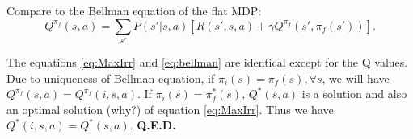 \documentclass{article} %
\newtheorem{definition}{Definition}
\newtheorem{theorem}{Theorem}
\newcommand{\suchthat}{ \mathrel{\ooalign{$\ni$\cr\kern-1pt$-$\kern-6.5pt$-$}}}
\begin{document}
Compare to the Bellman equation of the flat MDP:
\begin{equation}
    Q^{\pi_f}(s, a) = \sum_{s'}P(s'|s, a)[R(s', s, a) + \gamma Q^{\pi_f}(s', \pi_f(s'))].
    \label{eq:bellman}
\end{equation}

The equations \ref{eq:MaxIrr} and \ref{eq:bellman} are identical except for the Q values.
Due to uniqueness of Bellman equation, if $\pi_i(s) = \pi_f(s), \forall s$, we will have $Q^{\pi_f}(s, a) = Q^{\pi_f}(i, s, a)$. 
If $\pi_i(s) = \pi^*_f(s)$, $Q^*(s, a)$ is a solution and also an optimal solution (why?) of equation \ref{eq:MaxIrr}.
Thus we have $Q^*(i, s, a) = Q^*(s, a)$. \textbf{Q.E.D.}




\end{document}

